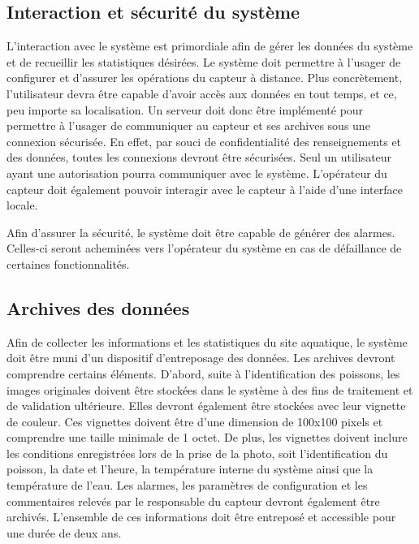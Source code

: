 
\subsection{Interaction et sécurité du système}

L'interaction avec le système est primordiale afin de gérer les données du système et de recueillir les statistiques désirées. Le système doit permettre à l'usager de configurer et d'assurer les opérations du capteur à distance. Plus concrètement, l'utilisateur devra être capable d'avoir accès aux données en tout temps, et ce, peu importe sa localisation. Un serveur doit donc être implémenté pour permettre à l'usager de communiquer au capteur et ses archives sous une connexion sécurisée. En effet, par souci de confidentialité des renseignements et des données, toutes les connexions devront être sécurisées. Seul un utilisateur ayant une autorisation pourra communiquer avec le système. L'opérateur du capteur doit également pouvoir interagir avec le capteur à l'aide d'une interface locale.

Afin d'assurer la sécurité, le système doit être capable de générer des alarmes. Celles-ci seront acheminées vers l'opérateur du système en cas de défaillance de certaines fonctionnalités. 

\subsection{Archives des données}
\label{subsection:Archives_des_données}

Afin de collecter les informations et les statistiques du site aquatique, le système doit être muni d'un dispositif d'entreposage des données. Les archives devront comprendre certains éléments. D'abord, suite à l'identification des poissons, les images originales doivent être stockées dans le système à des fins de traitement et de validation ultérieure. Elles devront également être stockées avec leur vignette de couleur. Ces vignettes doivent être d'une dimension de 100x100 pixels et comprendre une taille minimale de 1 octet. De plus, les vignettes doivent inclure les conditions enregistrées lors de la prise de la photo, soit l'identification du poisson, la date et l'heure, la température interne du système ainsi que la température de l'eau. Les alarmes, les paramètres de configuration et les commentaires relevés par le responsable du capteur devront également être archivés. L'ensemble de ces informations doit être entreposé et accessible pour une durée de deux ans.

